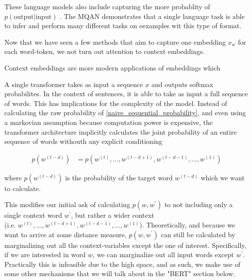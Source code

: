 \documentclass[a4paper,12pt,twoside,openright]{report}
\begin{document}

These language models also include capturing the more probablity of $p(\text {output} | \text {input})$
. The MQAN demonstrates that a single language task is able to infer and perform many different tasks on eexamples wit this type of format.


Now that we have seen a few methods that aim to capture one embedding $x_w$ for each word-token, we not turn out attention to context embeddings.

Context embeddings are more modern applications of embeddings which 

A single transformer takes as input a sequence $x$ and outputs softmax probabilites.
In the context of sentences, it is able to take as input a full sequence of words.
This has implications for the complexity of the model.
Instead of calculating the raw probability of \eqref{naive_sequential_probability}, and even using a markovian assumption because computation power is expensive, the transformer architecture implicitly calculates the joint probability of an entire sequence of words withouth any explicit conditioning


\begin{align}
p(w^{(t-d)}) &= p(w^{(t)}, \ldots, w^{(t-d + 1)}, w^{(t-d - 1)}, \ldots, w^{(1)})
\end{align}{\label{eq:transformer_probability}}

where $p(w^{(t-d)})$ is the probability of the target word $w^{(t-d)}$ which we want to calculate.

This modifies our initial ask of calculating $p(w, w^{\prime})$ to not including only a single context word $w^{\prime}$, but rather a wider context \\ (i.e. $w^{(t)}, \ldots, w^{(t-d + 1)}, w^{(t-d - 1)}, \ldots, w^{(1)}$).
Theoretically, and because we want to arrive at some distance measure, $p(w, w^{\prime})$ can still be calculated by marginalizing out all the context-variables except the one of interest.
Specifically, if we are interested in word $w$, we can marginalize out all input words except $w^{\prime}$.
Practically this is infeasible due to the high space, and as such, we make use of some other mechanisms that we will talk about in the "BERT" section below.

\end{document}
